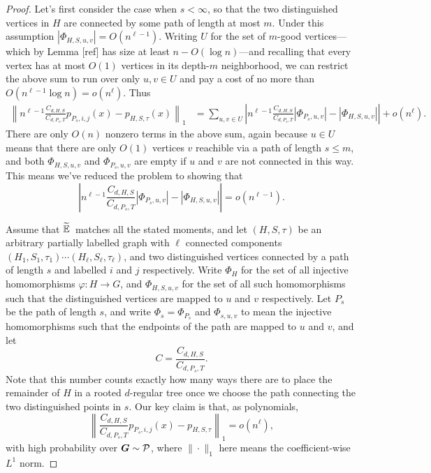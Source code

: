 \begin{proof}
    Let's first consider the case when $s < \infty$, so that the two distinguished vertices in $H$ are connected by some path of length at most $m$. Under this assumption $|\Phi_{H,S,u,v}| = O(n^{\ell - 1})$. Writing $U$ for the set of $m$-good vertices---which by Lemma [ref] has size at least $n - O(\log n)$---and recalling that every vertex has at most $O(1)$ vertices in its depth-$m$ neighborhood, we can restrict the above sum to run over only $u,v \in U$ and pay a cost of no more than $O(n^{\ell - 1}\log n) = o(n^\ell)$. Thus
    \begin{align*}
        \left\| n^{\ell - 1}\frac{C_{d,H,S}}{C_{d,P_s,T}} p_{P_s,i,j}(x) - p_{H,S,\tau}(x) \right\|_1 
        &= \sum_{u,v \in U} \left|n^{\ell - 1}\frac{C_{d,H,S}}{C_{d,P_s,T}}|\Phi_{P_s,u,v}| - |\Phi_{H,S,u,v}| \right| + o(n^\ell).
    \end{align*}
    There are only $O(n)$ nonzero terms in the above sum, again because $u\in U$ means that there are only $O(1)$ vertices $v$ reachible via a path of length $s \le m$, and both $\Phi_{H,S,u,v}$ and $\Phi_{P_s,u,v}$ are empty if $u$ and $v$ are not connected in this way. This means we've reduced the problem to showing that
    $$
        \left|n^{\ell - 1}\frac{C_{d,H,S}}{C_{d,P_s,T}}|\Phi_{P_s,u,v}| - |\Phi_{H,S,u,v}| \right| = o(n^{\ell - 1}).
    $$
    






    Assume that $\widetilde{\operatorname*{\mathbb{E}}}\,$ matches all the stated moments, and let $(H,S,\tau)$ be an arbitrary partially labelled graph with $\ell$ connected components $(H_1,S_1,\tau_1) \cdots (H_\ell,S_\ell,\tau_\ell)$, and two distinguished vertices connected by a path of length $s$ and labelled $i$ and $j$ respectively. Write $\Phi_H$ for the set of all injective homomorphisms $\varphi: H \to G$, and $\Phi_{H,S,u,v}$ for the set of all such homomorphisms such that the distinguished vertices are mapped to $u$ and $v$ respectively. Let $P_s$ be the path of length $s$, and write $\Phi_s = \Phi_{P_s}$ and $\Phi_{s,u,v}$ to mean the injective homomorphisms such that the endpoints of the path are mapped to $u$ and $v$, and let
    $$
        C = \frac{C_{d,H,S}}{C_{d,P_s,T}}.
    $$
    Note that this number counts exactly how many ways there are to place the remainder of $H$ in a rooted $d$-regular tree once we choose the path connecting the two distinguished points in $s$. Our key claim is that, as polynomials,
    $$
        \left\|\frac{C_{d,H,S}}{C_{d,P_s,T}}p_{P_s,i,j}(x) - p_{H,S,\tau} \right\|_1 = o(n^\ell),
    $$
    with high probability over $\boldsymbol{G} \sim \mathcal{P}$, where $\| \cdot \|_1$ here means the coefficient-wise $L^1$ norm. 


\end{proof}
